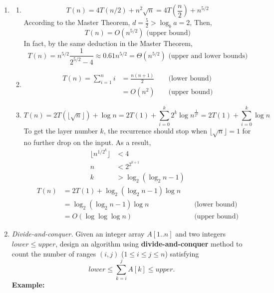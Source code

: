 \documentclass[12pt,a4paper]{article}
\makeatletter
\newtheorem*{solution}{Solution}
\theoremstyle{definition}
\renewenvironment{solution}[1][Solution] {\par\pushQED{\qed}\normalfont\topsep6\p@\@plus6\p@\relax\trivlist\item[\hskip\labelsep\bfseries#1\@addpunct{.}]\ignorespaces}{\popQED\endtrivlist\@endpefalse} \makeatother
\makeatother
\begin{document}
\begin{enumerate}
\begin{solution}
\begin{enumerate}
        \item \begin{equation*}
            T(n) = 4 T(n / 2)+n^{2} \sqrt{n} = 4T\left(\frac{n}{2}\right) + n^{5/2}
        \end{equation*}
        According to the Master Theorem, $d=\frac{5}{2} > \log_b a = 2$, Then,
        \begin{equation*}
            T(n) = O(n^{5/2}) \text{ (upper bound)}
        \end{equation*}
        In fact, by the same deduction in the Master Theorem,
        \begin{equation*}
            T(n) = n^{5/2}\frac{1}{2^{5/2}-4} \approx 0.61 n^{5/2} = \Theta(n^{5/2}) \text{ (upper and lower bounds)}
        \end{equation*}
        \item \begin{align*}
            T(n) = \sum_{i=1}^n i &= \frac{n(n+1)}{2}&&\text{ (lower bound)}\\
            &= O(n^2)&&\text{ (upper bound)}
        \end{align*}
       
        \item \begin{equation*}
            T(n)=2T(\lfloor \sqrt n\rfloor)+\log n = 2T(1) + \sum_{i=0}^k 2^k \log n^{\frac{1}{2^k}} = 2T(1) + \sum_{i=0}^k \log n
        \end{equation*}
        To get the layer number $k$, the recurrence should stop when $\lfloor \sqrt n\rfloor=1$ for no further drop on the input. As a result,
        \begin{align*}
           \lfloor n^{1/2^{k}}\rfloor &< 4 \\
           n&< 2^{2^{k+1}}\\
           k&> \log_2 (\log_2 n - 1)
        \end{align*}
        \begin{align*}
            T(n)&=2T(1)+\log_2 (\log_2 n - 1)\log n\\
            &=\log_2 (\log_2 n - 1)\log n&&\text{ (lower bound)} \\
            &= O(\log\log\log n)&&\text{ (upper bound)}
        \end{align*}
    \end{enumerate}
    
\end{solution}
\item
\textit{Divide-and-conquer.} Given an integer array $A[1..n]$ and two integers $lower \le upper$, design an algorithm using \textbf{divide-and-conquer} method to count the number of ranges $(i,j)$ ($1 \leq i \leq j \leq n$) satisfying
$$
    lower \leq \sum_{k=i}^{j}{A[k]} \leq upper.
$$
\textbf{Example:}


\end{enumerate}
\end{document}
